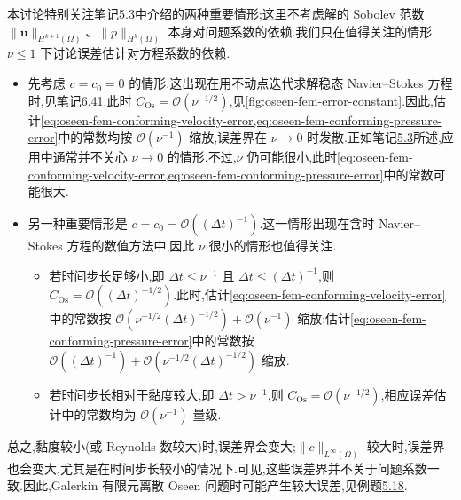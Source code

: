 \begin{note}[误差界对问题系数的依赖]\label{note:oseen-fem-error-coefficient-dependence}
本讨论特别关注笔记\hyperref[note:oseen-coefficients]{5.3}中介绍的两种重要情形;这里不考虑解的 Sobolev 范数 $\|\bm{u}\|_{H^{k+1}(\Omega)}$、$\|p\|_{H^k(\Omega)}$ 本身对问题系数的依赖.我们只在值得关注的情形 $\nu\le1$ 下讨论误差估计对方程系数的依赖.
\begin{itemize}
  \item 先考虑 $c=c_0=0$ 的情形.这出现在用不动点迭代求解稳态 Navier--Stokes 方程时,见笔记\hyperref[note:steady-ns-picard-iteration]{6.41}.此时 $C_{\mathrm{Os}}=\mathcal{O}(\nu^{-1/2})$,见\cref{fig:oseen-fem-error-constant}.因此,估计\cref{eq:oseen-fem-conforming-velocity-error,eq:oseen-fem-conforming-pressure-error}中的常数均按 $\mathcal{O}(\nu^{-1})$ 缩放,误差界在 $\nu\to0$ 时发散.正如笔记\hyperref[note:oseen-coefficients]{5.3}所述,应用中通常并不关心 $\nu\to0$ 的情形.不过,$\nu$ 仍可能很小,此时\cref{eq:oseen-fem-conforming-velocity-error,eq:oseen-fem-conforming-pressure-error}中的常数可能很大.
  \item 另一种重要情形是 $c=c_0=\mathcal{O}((\Delta t)^{-1})$.这一情形出现在含时 Navier--Stokes 方程的数值方法中,因此 $\nu$ 很小的情形也值得关注.
  \begin{itemize}
    \item 若时间步长足够小,即 $\Delta t\le\nu^{-1}$ 且 $\Delta t\le(\Delta t)^{-1}$,则 $C_{\mathrm{Os}}=\mathcal{O}((\Delta t)^{-1/2})$.此时,估计\cref{eq:oseen-fem-conforming-velocity-error}中的常数按 $\mathcal{O}(\nu^{-1/2}(\Delta t)^{-1/2})+\mathcal{O}(\nu^{-1})$ 缩放;估计\cref{eq:oseen-fem-conforming-pressure-error}中的常数按 $\mathcal{O}((\Delta t)^{-1})+\mathcal{O}(\nu^{-1/2}(\Delta t)^{-1/2})$ 缩放.
    \item 若时间步长相对于黏度较大,即 $\Delta t>\nu^{-1}$,则 $C_{\mathrm{Os}}=\mathcal{O}(\nu^{-1/2})$,相应误差估计中的常数均为 $\mathcal{O}(\nu^{-1})$ 量级.
  \end{itemize}
\end{itemize}
总之,黏度较小(或 Reynolds 数较大)时,误差界会变大;$\|c\|_{L^\infty(\Omega)}$ 较大时,误差界也会变大,尤其是在时间步长较小的情况下.可见,这些误差界并不关于问题系数一致.因此,Galerkin 有限元离散 Oseen 问题时可能产生较大误差,见例题\hyperref[ex:oseen-fem-analytical-error-example]{5.18}.
\end{note}

